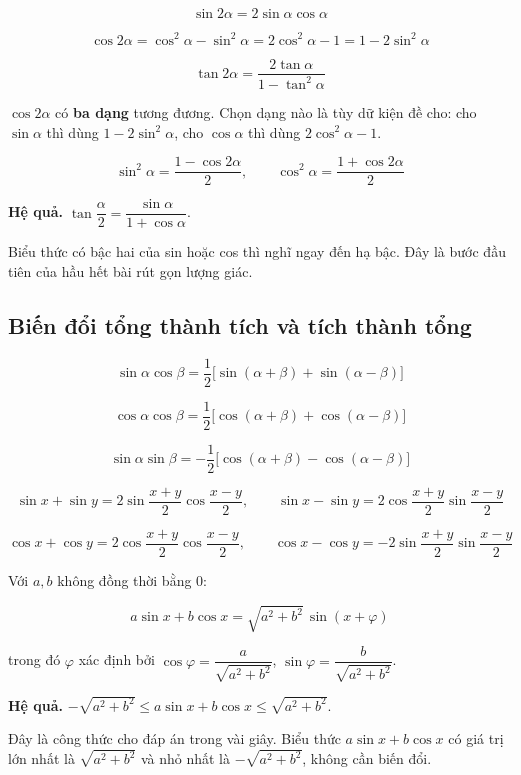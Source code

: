 \documentclass[11pt, a4paper]{article}
\begin{document}
\begin{dinhly}
$$\sin 2\alpha = 2\sin\alpha\cos\alpha$$

$$\cos 2\alpha = \cos^2\alpha - \sin^2\alpha = 2\cos^2\alpha - 1 = 1 - 2\sin^2\alpha$$

$$\tan 2\alpha = \frac{2\tan\alpha}{1 - \tan^2\alpha}$$

 $\cos 2\alpha$ có \textbf{ba dạng} tương đương. Chọn dạng nào là tùy dữ kiện đề cho: cho $\sin\alpha$ thì dùng $1 - 2\sin^2\alpha$, cho $\cos\alpha$ thì dùng $2\cos^2\alpha - 1$.
\end{dinhly}
\begin{dinhly}
$$\sin^2\alpha = \frac{1 - \cos 2\alpha}{2}, \qquad \cos^2\alpha = \frac{1 + \cos 2\alpha}{2}$$

\textbf{Hệ quả.} $\tan\dfrac{\alpha}{2} = \dfrac{\sin\alpha}{1 + \cos\alpha}$.

 Biểu thức có bậc hai của sin hoặc cos thì nghĩ ngay đến hạ bậc. Đây là bước đầu tiên của hầu hết bài rút gọn lượng giác.
\end{dinhly}
\subsection{Biến đổi tổng thành tích và tích thành tổng}

\begin{dinhly}
$$\sin\alpha\cos\beta = \frac{1}{2}\big[\sin(\alpha+\beta) + \sin(\alpha-\beta)\big]$$

$$\cos\alpha\cos\beta = \frac{1}{2}\big[\cos(\alpha+\beta) + \cos(\alpha-\beta)\big]$$

$$\sin\alpha\sin\beta = -\frac{1}{2}\big[\cos(\alpha+\beta) - \cos(\alpha-\beta)\big]$$
\end{dinhly}
\begin{dinhly}
$$\sin x + \sin y = 2\sin\frac{x+y}{2}\cos\frac{x-y}{2}, \qquad \sin x - \sin y = 2\cos\frac{x+y}{2}\sin\frac{x-y}{2}$$

$$\cos x + \cos y = 2\cos\frac{x+y}{2}\cos\frac{x-y}{2}, \qquad \cos x - \cos y = -2\sin\frac{x+y}{2}\sin\frac{x-y}{2}$$
\end{dinhly}
\begin{dinhly}
Với $a, b$ không đồng thời bằng $0$:

$$a\sin x + b\cos x = \sqrt{a^2+b^2}\,\sin(x + \varphi)$$

trong đó $\varphi$ xác định bởi $\cos\varphi = \dfrac{a}{\sqrt{a^2+b^2}}$, $\sin\varphi = \dfrac{b}{\sqrt{a^2+b^2}}$.

\textbf{Hệ quả.} $-\sqrt{a^2+b^2} \le a\sin x + b\cos x \le \sqrt{a^2+b^2}$.

 Đây là công thức cho đáp án trong vài giây. Biểu thức $a\sin x + b\cos x$ có giá trị lớn nhất là $\sqrt{a^2+b^2}$ và nhỏ nhất là $-\sqrt{a^2+b^2}$, không cần biến đổi.

\end{dinhly}
\end{document}
